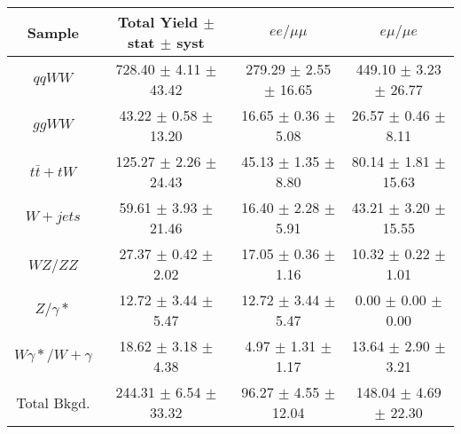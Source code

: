 \begin{table}[ht!]
  \begin{center}
  \begin{tabular} {|c|c|c|c|}
\hline
Sample                & Total Yield $\pm$ stat $\pm$ syst & $ee/\mu\mu$  & $e\mu/\mu e$ \\ \hline \hline
$qqWW$                & 728.40 $\pm$ 4.11 $\pm$ 43.42   & 279.29 $\pm$ 2.55 $\pm$ 16.65   & 449.10 $\pm$ 3.23 $\pm$ 26.77 \\ \hline
$ggWW$                & 43.22 $\pm$ 0.58 $\pm$ 13.20   & 16.65 $\pm$ 0.36 $\pm$ 5.08   & 26.57 $\pm$ 0.46 $\pm$ 8.11 \\ \hline
$t\bar{t} + tW$       & 125.27 $\pm$ 2.26 $\pm$ 24.43   & 45.13 $\pm$ 1.35 $\pm$ 8.80   & 80.14 $\pm$ 1.81 $\pm$ 15.63 \\ \hline
$W+jets$              & 59.61 $\pm$ 3.93 $\pm$ 21.46   & 16.40 $\pm$ 2.28 $\pm$ 5.91   & 43.21 $\pm$ 3.20 $\pm$ 15.55 \\ \hline
$WZ$/$ZZ$             & 27.37 $\pm$ 0.42 $\pm$ 2.02   & 17.05 $\pm$ 0.36 $\pm$ 1.16   & 10.32 $\pm$ 0.22 $\pm$ 1.01 \\ \hline
$Z/\gamma*$           & 12.72 $\pm$ 3.44 $\pm$ 5.47   & 12.72 $\pm$ 3.44 $\pm$ 5.47   & 0.00 $\pm$ 0.00 $\pm$ 0.00 \\ \hline
$W\gamma*/W+\gamma$   & 18.62 $\pm$ 3.18 $\pm$ 4.38   & 4.97 $\pm$ 1.31 $\pm$ 1.17   & 13.64 $\pm$ 2.90 $\pm$ 3.21 \\ \hline \hline
Total Bkgd.           & 244.31 $\pm$ 6.54 $\pm$ 33.32   & 96.27 $\pm$ 4.55 $\pm$ 12.04   & 148.04 $\pm$ 4.69 $\pm$ 22.30 \\ \hline \hline

\end{tabular}
\end{center}
\end{table}
